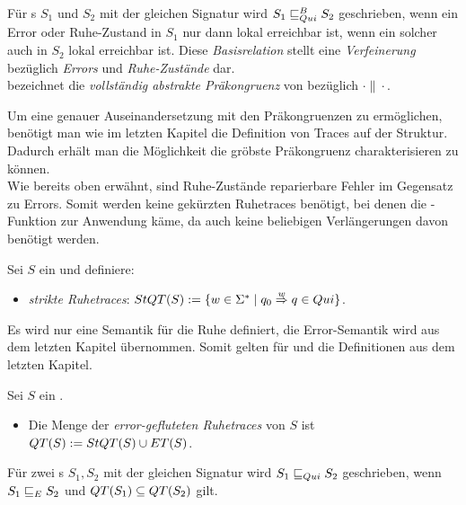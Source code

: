 \begin{Def}
  \label{DefQuiBasisrel}
  Für \EIO{}s $S_1$ und $S_2$ mit der gleichen Signatur wird
  $S_1\sqsubseteq _{Qui}^B S_2$ geschrieben, wenn ein Error oder Ruhe-Zustand in $S_1$ nur
  dann lokal erreichbar ist, wenn ein solcher auch in $S_2$ lokal erreichbar
  ist. Diese \emph{Basisrelation} stellt eine \emph{Verfeinerung} bezüglich
  \emph{Errors} und \emph{Ruhe-Zustände} dar.\\
  \QCRel{} bezeichnet die \emph{vollständig abstrakte Präkongruenz} von
  \QBRel{} bezüglich $\cdot\|\cdot$.
\end{Def}

Um eine genauer Auseinandersetzung mit den Präkongruenzen zu ermöglichen,
benötigt man wie im letzten Kapitel die Definition von Traces auf der Struktur.
Dadurch erhält man die Möglichkeit die gröbste Präkongruenz charakterisieren zu
können.\\
Wie bereits oben erwähnt, sind Ruhe-Zustände reparierbare Fehler im Gegensatz
zu Errors. Somit werden keine gekürzten Ruhetraces benötigt, bei denen die
\prune{}-Funktion zur Anwendung käme, da auch keine beliebigen Verlängerungen
davon benötigt werden.

\begin{Def}[Ruhetraces]
  \label{DefRuhetraces}
  Sei $S$ ein \EIO{} und definiere:
  \begin{itemize}
    \item \emph{strikte Ruhetraces}: $StQT{}(S) := \{w\in\Sigma ^*\mid q_0
      \overset{w}{\Rightarrow} q\in Qui\}$.
  \end{itemize}
\end{Def}

Es wird nur eine Semantik für die Ruhe definiert, die Error-Semantik wird aus
dem letzten Kapitel übernommen. Somit gelten für \ET{} und \EL{} die
Definitionen aus dem letzten Kapitel.

\begin{Def}
  \label{DefQTQL}
  Sei $S$ ein \EIO{}.
  \begin{itemize}
    \item Die Menge der \emph{error-gefluteten Ruhetraces} von $S$ ist
      $QT{}(S) := StQT{}(S)\cup ET{}(S)$.
  \end{itemize}
  Für zwei \EIO{}s $S_1, S_2$ mit der gleichen Signatur wird
  $S_1\sqsubseteq _{Qui} S_2$ geschrieben, wenn $S_1\sqsubseteq _E S_2$ und $QT{}(S_1)\subseteq
  QT{}(S_2)$ gilt.
\end{Def}

